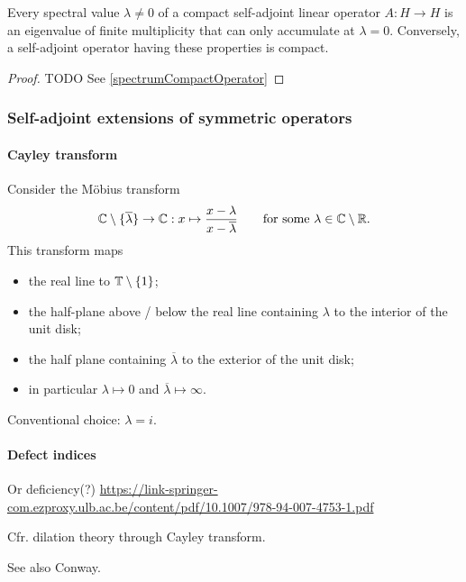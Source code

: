 \begin{theorem}
Every spectral value $\lambda\neq 0$ of a compact self-adjoint linear
operator $A : H \to H$ is an eigenvalue of finite multiplicity that can only
accumulate at $\lambda = 0$. Conversely, a self-adjoint operator having these
properties is compact.
\end{theorem}
\begin{proof}
TODO See \ref{spectrumCompactOperator}
\end{proof}

\subsubsection{Self-adjoint extensions of symmetric operators}
\paragraph{Cayley transform}
Consider the Möbius transform
\[ \mathbb{C}\setminus\{\overline{\lambda}\} \to \mathbb{C}: x\mapsto \frac{x - \lambda}{x-\overline{\lambda}} \qquad \text{for some $\lambda\in\mathbb{C}\setminus\mathbb{R}$.} \]
This transform maps
\begin{itemize}
\item the real line to $\mathbb{T}\setminus\{1\}$;
\item the half-plane above / below the real line containing $\lambda$ to the interior of the unit disk;
\item the half plane containing $\overline{\lambda}$ to the exterior of the unit disk;
\item in particular $\lambda \mapsto 0$ and $\overline{\lambda} \mapsto \infty$.
\end{itemize}
Conventional choice: $\lambda = i$.

\paragraph{Defect indices}
Or deficiency(?)
\url{https://link-springer-com.ezproxy.ulb.ac.be/content/pdf/10.1007/978-94-007-4753-1.pdf}

Cfr. dilation theory through Cayley transform.

See also Conway.


